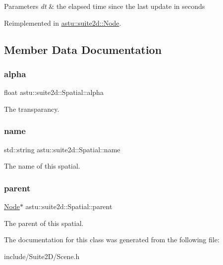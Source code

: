 \begin{DoxyParams}{Parameters}
{\em dt} & the elapsed time since the last update in seconds \\
\hline
\end{DoxyParams}


Reimplemented in \hyperlink{classastu_1_1suite2d_1_1Node_af3fbe9c9588b3f20a1d58645fd2371e0}{astu\+::suite2d\+::\+Node}.



\subsection{Member Data Documentation}
\mbox{\label{classastu_1_1suite2d_1_1Spatial_a8aedfdadbece638bf283d4ba232c6928}} 
\subsubsection{\texorpdfstring{alpha}{alpha}}
{\footnotesize\ttfamily float astu\+::suite2d\+::\+Spatial\+::alpha\hspace{0.3cm}{\ttfamily [protected]}}

The transparancy. \mbox{\label{classastu_1_1suite2d_1_1Spatial_af317fff32a847e427f675d564a17e65a}} 
\subsubsection{\texorpdfstring{name}{name}}
{\footnotesize\ttfamily std\+::string astu\+::suite2d\+::\+Spatial\+::name\hspace{0.3cm}{\ttfamily [protected]}}

The name of this spatial. \mbox{\label{classastu_1_1suite2d_1_1Spatial_a5437ad18bb6b8752711ee229bafe6f46}} 
\subsubsection{\texorpdfstring{parent}{parent}}
{\footnotesize\ttfamily \hyperlink{classastu_1_1suite2d_1_1Node}{Node}$\ast$ astu\+::suite2d\+::\+Spatial\+::parent\hspace{0.3cm}{\ttfamily [protected]}}

The parent of this spatial. 

The documentation for this class was generated from the following file\+:\begin{DoxyCompactItemize}
\item 
include/\+Suite2\+D/Scene.\+h\end{DoxyCompactItemize}
